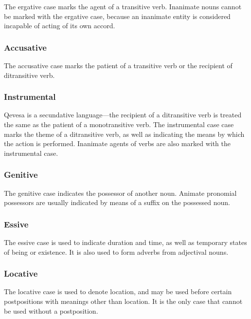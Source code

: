 \documentclass[grammar]{subfiles}
\begin{document}
The ergative case marks the agent of a transitive verb.  Inanimate nouns cannot
be marked with the ergative case, because an inanimate entity is considered
incapable of acting of its own accord. 


\subsubsection{Accusative}
\label{sssec:ns_accusative_case}

The accusative case marks the patient of a transitive verb or the recipient of
ditransitive verb.


\subsubsection{Instrumental}
\label{sssec:ns_instrumental_case}

Qevesa is a secundative language—the recipient of a ditransitive verb
is treated the same as the patient of a monotransitive verb. The instrumental
case case marks the theme of a ditransitive verb, as well as indicating the
means by which the action is performed.  Inanimate agents of verbs are also
marked with the instrumental case.  

\Tbw


\subsubsection{Genitive}
\label{sssec:ns_genitive_case}

The genitive case indicates the possessor of another noun.  Animate pronomial
possessors are usually indicated by means of a suffix on the possessed noun.


\subsubsection{Essive}
\label{sssec:ns_essive_case}
 
The essive case is used to indicate duration and time, as well as temporary
states of being or existence.  It is also used to form adverbs from adjectival
nouns.
 
 
\subsubsection{Locative}
\label{sssec:ns_locative_case}
 
The locative case is used to denote location, and may be used before certain
postpositions with meanings other than location.  It is the only case that
cannot be used without a postposition.
\end{document}
